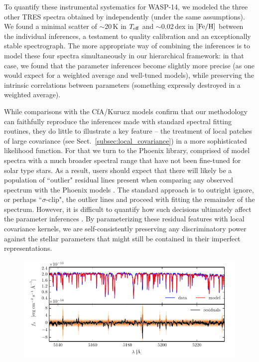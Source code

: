 \documentclass[iop,floatfix]{emulateapj}
\newcommand{\Z}{[{\rm Fe}/{\rm H}]}
\newcommand{\comm}[1]{ \textcolor{red}{SA: #1}}
\begin{document}
To quantify these instrumental systematics for WASP-14, we modeled the three other TRES spectra 
obtained by \citet{torres12} independently (under the same assumptions).  We found a minimal 
scatter of $\sim$20\,K in $T_{\rm eff}$ and $\sim$0.02\,dex in $\Z$ between the individual 
inferences, a testament to quality calibration and an exceptionally stable spectrograph.  The more 
appropriate way of combining the inferences is to model these four spectra simultaneously in our 
hierarchical framework: in that case, we found that the parameter inferences become slightly more 
precise (as one would expect for a weighted average and well-tuned models), while preserving the 
intrinsic correlations between parameters (something expressly destroyed in a weighted average).


While comparisons with the {\sc CfA/Kurucz} models confirm that our methodology can faithfully 
reproduce the inferences made with standard spectral fitting routines, they do little to illustrate 
a key feature -- the treatment of local patches of large covariance (see 
Sect.~\ref{subsec:local_covariance}) in a more sophisticated likelihood function.  For that we turn 
to the {\sc Phoenix} library, comprised of model spectra with a much broader spectral range that 
have not been fine-tuned for solar type stars.  As a result, users should expect that there will 
likely be a population of ``outlier" residual lines present when comparing any observed spectrum 
with the {\sc Phoenix} models \citep[e.g.,][their Fig.~8]{husser13}.  The standard approach is to 
outright ignore, or perhaps ``$\sigma$-clip", the outlier lines and proceed with fitting the 
remainder of the spectrum.  However, it is difficult to quantify how such decisions ultimately 
affect the parameter inferences \citep{hogg10}.  By parameterizing these residual features with 
local covariance kernels, we are self-consistently preserving any discriminatory power against the 
stellar parameters that might still be contained in their imperfect representations.  

\begin{figure}[!htb]
\includegraphics{figs/residuals_PHOENIX_logg.pdf}
\end{figure}
\end{document}
